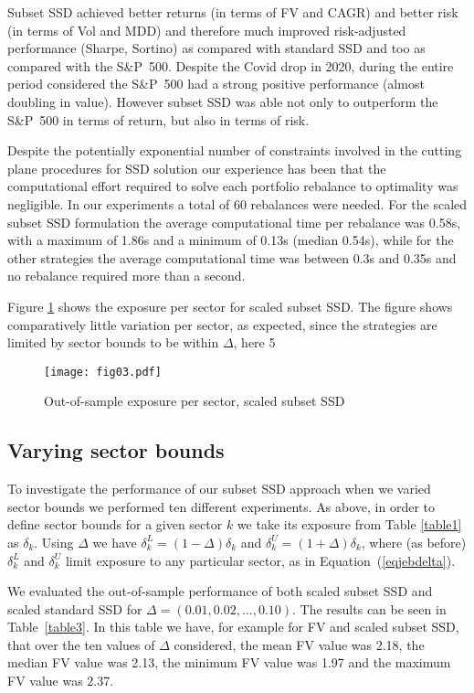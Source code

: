 Subset SSD achieved better returns (in terms of FV and CAGR) and better risk (in terms of Vol and MDD) and therefore much improved risk-adjusted performance (Sharpe, Sortino) as compared with  standard SSD and too as compared with the S\&P~500.
Despite the Covid drop in 2020, during the entire period considered the S\&P~500 had a strong positive performance (almost doubling in value). However subset SSD was able not only to outperform the S\&P~500 in terms of return, but also in terms of risk.

Despite the potentially exponential number of constraints involved in the cutting plane procedures for SSD solution our experience has been that 
the computational effort required to solve each portfolio rebalance to optimality was negligible. In our experiments a total of 60 rebalances were needed. For the scaled subset SSD formulation the average computational time per rebalance was 0.58s, with a maximum of 1.86s and a minimum of 0.13s (median 0.54s), while for the other strategies the average computational time was between 0.3s and 0.35s and no rebalance required more than a second.

Figure \ref{fig3} shows the exposure per sector for scaled subset SSD. The figure shows comparatively  little variation per sector, as expected, since the strategies are limited by sector bounds to be within $\Delta$, here 5\
\begin{figure}[!ht]
\centering
\texttt{[image: fig03.pdf]}
  \caption{Out-of-sample exposure per sector, scaled subset SSD}
  \label{fig3}
\end{figure}

\subsection{Varying sector bounds}


To investigate the performance of our subset SSD approach when we varied sector bounds we performed ten different 
experiments. As above,
in order to define sector bounds for a given sector $k$ we take its exposure from Table \ref{table1} as $\delta_k$. Using
 $\Delta$ we have $\delta_k^L = (1 - \Delta) \delta_k $ and $\delta_k^U = (1 + \Delta) \delta_k$, where (as before)
$\delta_k^L$ and $\delta_k^U$ limit exposure to any particular sector, as in Equation~(\ref{eqjebdelta}).

We evaluated the  out-of-sample performance of both scaled subset SSD and scaled standard SSD for $\Delta = (0.01, 0.02, \dots, 0.10)$.
The results can be seen in Table~\ref{table3}. In this table we have, for example for FV and scaled subset SSD, that over the ten 
values of $\Delta$ considered, the mean FV value was 2.18, the median FV value was 2.13, the minimum FV value was 1.97 and the maximum FV value was 2.37.


